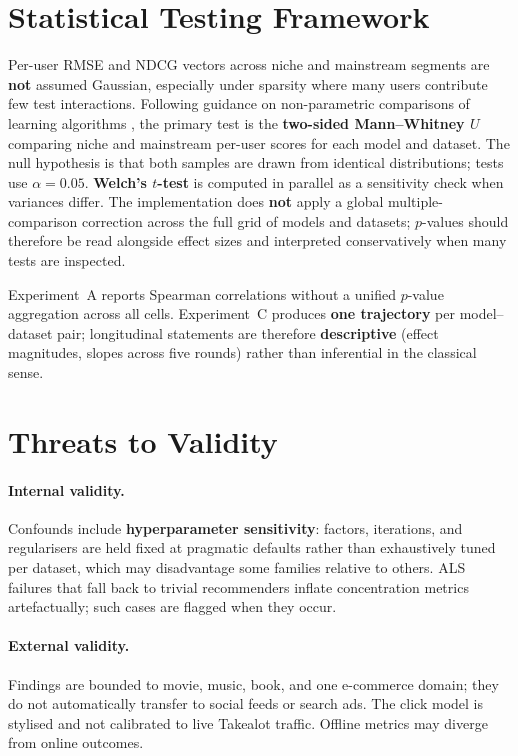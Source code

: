 \section{Statistical Testing Framework}
\label{sec:method_stats}

Per-user RMSE and NDCG vectors across niche and mainstream segments are \textbf{not} assumed Gaussian, especially under sparsity where many users contribute few test interactions. Following guidance on non-parametric comparisons of learning algorithms \citep{demsar2006statistical}, the primary test is the \textbf{two-sided Mann--Whitney $U$} comparing niche and mainstream per-user scores for each model and dataset. The null hypothesis is that both samples are drawn from identical distributions; tests use $\alpha=0.05$. \textbf{Welch's $t$-test} is computed in parallel as a sensitivity check when variances differ. The implementation does \textbf{not} apply a global multiple-comparison correction across the full grid of models and datasets; $p$-values should therefore be read alongside effect sizes and interpreted conservatively when many tests are inspected.

Experiment~A reports Spearman correlations without a unified $p$-value aggregation across all cells. Experiment~C produces \textbf{one trajectory} per model--dataset pair; longitudinal statements are therefore \textbf{descriptive} (effect magnitudes, slopes across five rounds) rather than inferential in the classical sense.

\section{Threats to Validity}
\label{sec:method_threats}

\paragraph{Internal validity.}
Confounds include \textbf{hyperparameter sensitivity}: factors, iterations, and regularisers are held fixed at pragmatic defaults rather than exhaustively tuned per dataset, which may disadvantage some families relative to others. ALS failures that fall back to trivial recommenders inflate concentration metrics artefactually; such cases are flagged when they occur.

\paragraph{External validity.}
Findings are bounded to movie, music, book, and one e-commerce domain; they do not automatically transfer to social feeds or search ads. The click model is stylised and not calibrated to live Takealot traffic. Offline metrics may diverge from online outcomes.

